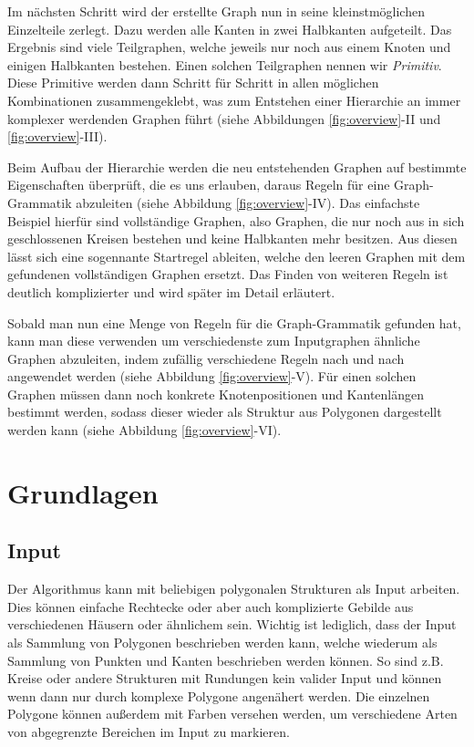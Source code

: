 Im nächsten Schritt wird der erstellte Graph nun in seine kleinstmöglichen Einzelteile zerlegt. Dazu werden alle Kanten in zwei Halbkanten
aufgeteilt. Das Ergebnis sind viele Teilgraphen, welche jeweils nur noch aus einem Knoten und einigen Halbkanten bestehen.
Einen solchen Teilgraphen nennen wir \textit{Primitiv}. Diese Primitive werden dann Schritt für Schritt in allen möglichen Kombinationen
zusammengeklebt, was zum Entstehen einer Hierarchie an immer komplexer werdenden Graphen führt (siehe Abbildungen \ref{fig:overview}-II und
\ref{fig:overview}-III).

Beim Aufbau der Hierarchie werden die neu entstehenden Graphen auf bestimmte
Eigenschaften überprüft, die es uns erlauben, daraus Regeln für eine Graph-Grammatik abzuleiten (siehe Abbildung \ref{fig:overview}-IV).
Das einfachste Beispiel hierfür sind
vollständige Graphen, also Graphen, die nur noch aus in sich geschlossenen Kreisen bestehen und keine Halbkanten mehr besitzen. Aus diesen lässt
sich eine sogennante Startregel ableiten, welche den leeren Graphen mit dem gefundenen vollständigen Graphen ersetzt. Das Finden von weiteren
Regeln ist deutlich komplizierter und wird später im Detail erläutert.

Sobald man nun eine Menge von Regeln für die Graph-Grammatik gefunden hat, kann man diese verwenden um verschiedenste zum Inputgraphen
ähnliche Graphen abzuleiten, indem zufällig verschiedene Regeln nach und nach angewendet werden (siehe Abbildung \ref{fig:overview}-V).
Für einen solchen Graphen müssen dann noch konkrete Knotenpositionen und Kantenlängen bestimmt werden, sodass dieser wieder als Struktur
aus Polygonen dargestellt werden kann (siehe Abbildung \ref{fig:overview}-VI).

\section{Grundlagen}
\subsection{Input}
Der Algorithmus kann mit beliebigen polygonalen Strukturen als Input arbeiten. Dies können einfache Rechtecke oder aber auch komplizierte Gebilde
aus verschiedenen Häusern oder ähnlichem sein. Wichtig ist lediglich, dass der Input als Sammlung von Polygonen beschrieben werden kann, welche
wiederum als Sammlung von Punkten und Kanten beschrieben werden können.
So sind z.B. Kreise oder andere Strukturen mit Rundungen kein valider Input und können wenn dann nur durch komplexe Polygone angenähert werden.
Die einzelnen Polygone können außerdem mit Farben versehen werden, um verschiedene Arten von abgegrenzte Bereichen im Input zu markieren.


